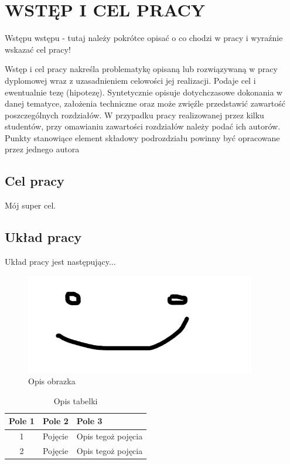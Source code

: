 \chapter{WSTĘP I CEL PRACY}
\label{chap:introduction}
Wstępu wstępu - tutaj należy pokrótce opisać o co chodzi w pracy i wyraźnie wskazać cel pracy!

Wstęp i cel pracy nakreśla problematykę opisaną lub rozwiązywaną w pracy dyplomowej wraz z uzasadnieniem celowości jej realizacji. Podaje cel i ewentualnie tezę (hipotezę). Syntetycznie opisuje dotychczasowe dokonania w danej tematyce, założenia techniczne oraz może zwięźle przedstawić zawartość poszczególnych rozdziałów. W przypadku pracy realizowanej przez kilku studentów, przy omawianiu zawartości rozdziałów należy podać ich autorów. Punkty stanowiące element składowy podrozdziału powinny być opracowane przez jednego autora

\section{Cel pracy}
Mój super cel. 
\section{Układ pracy}
Układ pracy jest następujący...

\begin{figure}[htbp]
    \centering
    \includegraphics[width=0.9\textwidth]{images/obrazek.png}
    \caption{Opis obrazka}
    \label{fig:buzka}
\end{figure}


\begin{table}[h]
\caption{Opis tabelki}
\label{tab:tab1}
 \centering
\begin{tabular}{|c|p{4.5cm}|p{6cm}|}
  \hline
  Pole 1 & Pole 2 & Pole 3\\
  \hline
  1 & Pojęcie & Opis tegoż pojęcia\\
  \hline
  2 & Pojęcie & Opis tegoż pojęcia\\
  \hline
\end{tabular}
\end{table}